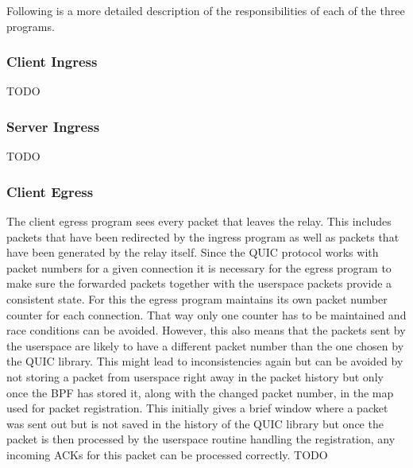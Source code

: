 Following is a more detailed description of the responsibilities of each of the three programs.
\subsubsection{Client Ingress} 
TODO
\subsubsection{Server Ingress}
TODO
\subsubsection{Client Egress}
The client egress program sees every packet that leaves the relay. 
This includes packets that have been redirected by the ingress program as well as packets that
have been generated by the relay itself.
Since the QUIC protocol works with packet numbers for a given connection it is necessary for 
the egress program to make sure the forwarded packets together with the userspace packets
provide a consistent state. 
For this the egress program maintains its own packet number counter for each connection.
That way only one counter has to be maintained and race conditions can be avoided.
However, this also means that the packets sent by the userspace are likely to have a different 
packet number than the one chosen by the QUIC library.
This might lead to inconsistencies again but can be avoided by not storing a packet from userspace
right away in the packet history but only once the BPF has stored it, along with the changed
packet number, in the map used for packet registration. %
This initially gives a brief window where a packet was sent out but is not saved in the history
of the QUIC library but once the packet is then processed by the userspace routine handling the 
registration, any incoming ACKs for this packet can be processed correctly.
TODO

